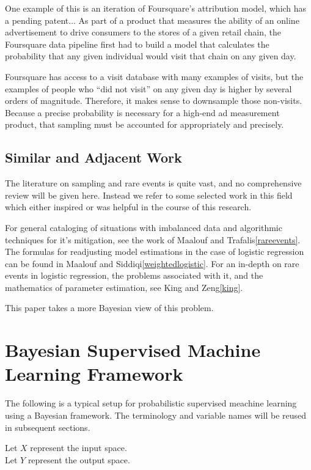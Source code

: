 \documentclass[twoside]{article}
\begin{document}
One example of this is an iteration of Foursquare’s attribution model, which has a pending patent\cite{visitprediction}... As part of a product that measures the ability of an online advertisement to drive consumers to the stores of a given retail chain, the Foursquare data pipeline first had to build a model that calculates the probability that any given individual would visit that chain on any given day.

Foursquare has access to a visit database with many examples of visits, but the examples of people who “did not visit” on any given day is higher by several orders of magnitude. Therefore, it makes sense to downsample those non-visits. Because a precise probability is necessary for a high-end ad measurement product, that sampling must be accounted for appropriately and precisely.

\subsection{Similar and Adjacent Work}

The literature on sampling and rare events is quite vast, and no comprehensive review will be given here. Instead we refer to some selected work in this field which either inspired or was helpful in the course of this research.

For general cataloging of situations with imbalanced data and algorithmic techniques for it's mitigation, see the work of Maalouf and Trafalis\ref{rareevents}. The formulas for readjusting model estimations in the case of logistic regression can be found in Maalouf and Siddiqi\ref{weightedlogistic}. For an in-depth on rare events in logistic regression, the problems associated with it, and the mathematics of parameter estimation, see King and Zeng\ref{king}.

This paper takes a more Bayesian view of this problem.

\section{Bayesian Supervised Machine Learning Framework} \label{framework}

The following is a typical setup for probabilistic supervised meachine learning using a Bayesian framework. The terminology and variable names will be reused in subsequent sections.

Let \(X\) represent the input space. \\
Let \(Y\) represent the output space.
\end{document}
